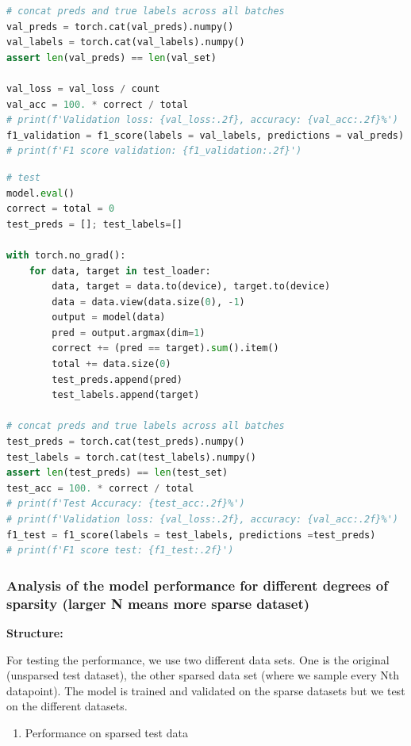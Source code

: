 \begin{solve}
\begin{lstlisting}[language=python, title= Validation Loop]
# concat preds and true labels across all batches
val_preds = torch.cat(val_preds).numpy()
val_labels = torch.cat(val_labels).numpy()
assert len(val_preds) == len(val_set)

val_loss = val_loss / count
val_acc = 100. * correct / total
# print(f'Validation loss: {val_loss:.2f}, accuracy: {val_acc:.2f}%')
f1_validation = f1_score(labels = val_labels, predictions = val_preds)
# print(f'F1 score validation: {f1_validation:.2f}')
\end{lstlisting}

\begin{lstlisting}[language=python, title=Test Loop]
# test
model.eval()
correct = total = 0
test_preds = []; test_labels=[]

with torch.no_grad():
    for data, target in test_loader:
        data, target = data.to(device), target.to(device)
        data = data.view(data.size(0), -1)
        output = model(data)
        pred = output.argmax(dim=1)
        correct += (pred == target).sum().item()
        total += data.size(0)
        test_preds.append(pred)
        test_labels.append(target)

# concat preds and true labels across all batches
test_preds = torch.cat(test_preds).numpy() 
test_labels = torch.cat(test_labels).numpy()
assert len(test_preds) == len(test_set)   
test_acc = 100. * correct / total
# print(f'Test Accuracy: {test_acc:.2f}%')
# print(f'Validation loss: {val_loss:.2f}, accuracy: {val_acc:.2f}%')
f1_test = f1_score(labels = test_labels, predictions =test_preds)
# print(f'F1 score test: {f1_test:.2f}')
\end{lstlisting}




\subsubsection{Analysis of the model performance for different degrees of sparsity (larger N means more sparse dataset)}

\textbf{Structure:} 

For testing the performance, we use two different data sets. One is the original (unsparsed test dataset), the other sparsed data set (where we sample every Nth datapoint). The model is trained and validated on the sparse datasets but we test on the different datasets.

\begin{enumerate}
    \item {Performance on sparsed test data}
    

\end{enumerate}
\end{solve}
